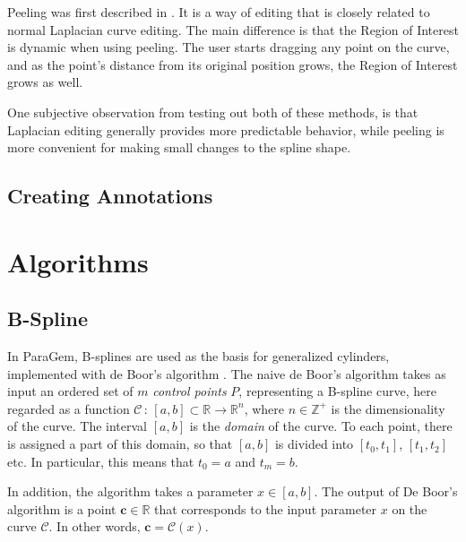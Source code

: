 \documentclass[english]{article}
\begin{document}
Peeling was first described in \cite{rigid_igarashi}. It is a way of editing that is closely related to normal Laplacian curve editing. The main difference is that the Region of Interest is dynamic when using peeling. The user starts dragging any point on the curve, and as the point's distance from its original position grows, the Region of Interest grows as well.

One subjective observation from testing out both of these methods, is that Laplacian editing generally provides more predictable behavior, while peeling is more convenient for making small changes to the spline shape.

\subsection{Creating Annotations}


\pagebreak

\section{Algorithms} \label{section_algorithms}

\subsection{B-Spline} \label{section_b_spline}


In ParaGem, B-splines are used as the basis for generalized cylinders, implemented with de Boor's algorithm \cite{deboor}. The naive de Boor's algorithm takes as input an ordered set of $m$ \textit{control points} $P$, representing a B-spline curve, here regarded as a function $\mathcal{C} \, : \, [a, b] \subset \mathbb{R} \rightarrow \mathbb{R}^n$, where $n \in \mathbb{Z^+}$ is the dimensionality of the curve. The interval $[a, b]$ is the \textit{domain} of the curve. To each point, there is assigned a part of this domain, so that $[a, b]$ is divided into $[t_0, t_1]$, $[t_1, t_2]$ etc. In particular, this means that $t_0 = a$ and $t_m = b$.

In addition, the algorithm takes a parameter $x \in [a, b]$. The output of De Boor's algorithm is a point $\mathbf{c} \in \mathbb{R}$ that corresponds to the input parameter $x$ on the curve $\mathcal{C}$. In other words, $\mathbf{c} = \mathcal{C}(x)$.
\end{document}
